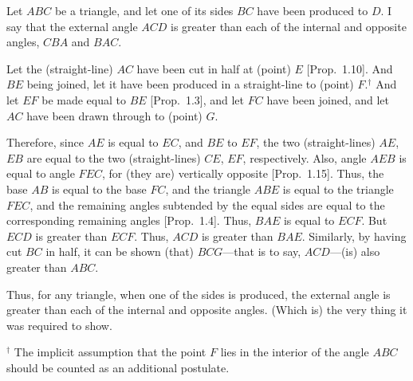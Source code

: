 \begin{Parallel}{}{}
{Let $ABC$ be a triangle, and let one of its sides $BC$ have been produced 
 to $D$. I say that the external angle $ACD$ is greater than each of the
 internal and opposite angles, $CBA$ and $BAC$.
 
 Let the (straight-line) $AC$ have been cut in half at (point) $E$ [Prop.~1.10].
 And $BE$ being joined, let it have been produced in a straight-line to
 (point) $F$.$^\dag$ And let $EF$ be made equal to $BE$ [Prop.~1.3], and let $FC$ have been joined, and let $AC$ have been drawn through to (point) $G$.

 Therefore, since $AE$ is equal to $EC$, and $BE$ to $EF$, the two (straight-lines)
 $AE$, $EB$ are equal to the two (straight-lines) $CE$, $EF$, respectively. 
 Also, angle $AEB$ is equal to angle $FEC$, for (they are)
 vertically opposite [Prop.~1.15]. Thus, the base $AB$ is equal to the base
 $FC$, and the triangle $ABE$ is equal to the triangle $FEC$, and the remaining
 angles subtended by the equal sides are equal to the corresponding remaining angles [Prop.~1.4]. Thus, $BAE$ is equal to $ECF$. But $ECD$ is greater than $ECF$. Thus,
 $ACD$ is greater than $BAE$. Similarly, by having cut $BC$ in half,  it can  be shown (that) $BCG$---that is to say, $ACD$---(is) also greater than $ABC$.
 
 \epsfysize=2.7in
\centerline{}
 
 Thus, for any triangle, when one of the sides is produced, the external angle
is greater than each of the internal and opposite angles. (Which is) the very thing
it was required to show.}
\end{Parallel}
{\footnotesize
\noindent $^\dag$  The implicit assumption that the point $F$ lies in the
 interior of the angle $ABC$ should be counted as an additional postulate.} 
 
